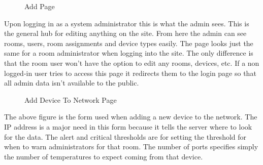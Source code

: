 \documentclass{report}
\begin{document}
\begin{figure}[H]
	\caption{Add Page}
\end{figure}
\indent
Upon logging in as a system administrator this is what the admin sees. This is the general hub for editing anything on the site. From here the admin can see rooms, users, room assignments and device types easily.
The page looks just the same for a room administrator when logging into the site. The only difference is that the room user won't have the option to edit any rooms, devices, etc. If a non logged-in user tries to access this page it redirects them to the login page so that all admin data isn't available to the public.
\newpage

\begin{figure}[H]
	\caption{Add Device To Network Page}
\end{figure}
\indent
The above figure is the form used when adding a new device to the network. The IP address is a major need in this form because it tells the server where to look for the data. The alert and critical thresholds are for setting the threshold for when to warn administrators for that room. The number of ports specifies simply the number of temperatures to expect coming from that device.
\newpage
\end{document}
